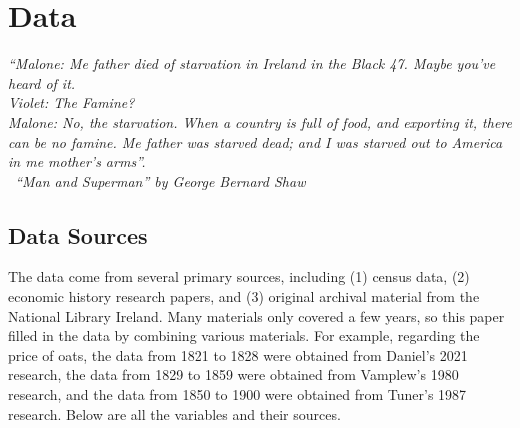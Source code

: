\chapter{Data}

\textit{
``Malone: Me father died of starvation in Ireland in the Black 47. Maybe you've heard of it.\\
Violet: The Famine?\\
Malone: No, the starvation. When a country is full of food, and exporting it, there can be no famine. Me father was starved dead; and I was starved out to America in me mother's arms''.\\
\textemdash\ ``Man and Superman'' by George Bernard Shaw
}

\section{Data Sources}
\vspace{0pt}
The data come from several primary sources, including (1) census data, (2) economic history research papers, and (3) original archival material from the National Library Ireland. Many materials only covered a few years, so this paper filled in the data by combining various materials. For example, regarding the price of oats, the data from 1821 to 1828 were obtained from Daniel's 2021 research, the data from 1829 to 1859 were obtained from Vamplew's 1980 research, and the data from 1850 to 1900 were obtained from Tuner's 1987 research. Below are all the variables and their sources.

\vspace{14pt}

